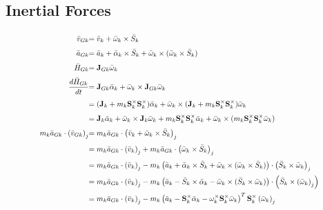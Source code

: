 \documentclass[a4paper,10pt]{article}
\newcommand\scalemath[2]{\scalebox{#1}{\mbox{\ensuremath{\displaystyle #2}}}}
\begin{document}
\subsection{Inertial Forces}
\begin{align}
 \scalemath{0.775}{\bar{v}_{Gk}}&\scalemath{0.775}{=\bar{v}_k+\bar{\omega}_k \times \bar{S}_k} \nonumber \\
 \scalemath{0.775}{\bar{a}_{Gk}}&\scalemath{0.775}{=\bar{a}_k+\bar{\alpha}_k \times \bar{S}_k + \bar{\omega}_k \times (\bar{\omega}_k \times \bar{S}_k)} \nonumber \\
 \scalemath{0.775}{\bar{H}_{Gk}}&\scalemath{0.775}{=\mathbf{J}_{Gk} \bar{\omega}_k} \nonumber \\ 
 \scalemath{0.775}{\frac{d\bar{H}_{Gk}}{dt}}&\scalemath{0.775}{=\mathbf{J}_{Gk} \bar{\alpha}_k + \bar{\omega}_k \times \mathbf{J}_{Gk} \bar{\omega}_k} \nonumber \\
 &\scalemath{0.775}{=(\mathbf{J}_{k}+m_k\mathbf{S}^{\times}_k\mathbf{S}^{\times}_k) \bar{\alpha}_k + \bar{\omega}_k \times (\mathbf{J}_{k}+m_k\mathbf{S}^{\times}_k\mathbf{S}^{\times}_k) \bar{\omega}_k} \nonumber \\
 &\scalemath{0.775}{=\mathbf{J}_{k} \bar{\alpha}_k + \bar{\omega}_k \times \mathbf{J}_{k} \bar{\omega}_k + m_k\mathbf{S}^{\times}_k\mathbf{S}^{\times}_k\bar{\alpha}_k + \bar{\omega}_k \times (m_k\mathbf{S}^{\times}_k\mathbf{S}^{\times}_k \bar{\omega}_k)} \nonumber \\
 \scalemath{0.775}{m_k \bar{a}_{Gk} \cdot \left(\bar{v}_{Gk}\right)_j} &\scalemath{0.775}{=  m_k \bar{a}_{Gk} \cdot \left(\bar{v}_k+\bar{\omega}_k \times \bar{S}_k\right)_j} \nonumber \\
 &\scalemath{0.775}{=  m_k \bar{a}_{Gk} \cdot \left(\bar{v}_k\right)_j + m_k \bar{a}_{Gk} \cdot \left(\bar{\omega}_k \times \bar{S}_k\right)_j} \nonumber \\
 &\scalemath{0.775}{=  m_k \bar{a}_{Gk} \cdot \left(\bar{v}_k\right)_j - m_k \left( \bar{a}_k+\bar{\alpha}_k \times \bar{S}_k + \bar{\omega}_k \times (\bar{\omega}_k \times \bar{S}_k) \right) \cdot \left(\bar{S}_k \times \bar{\omega}_k\right)_j} \nonumber \\
 &\scalemath{0.775}{=  m_k \bar{a}_{Gk} \cdot \left(\bar{v}_k\right)_j - m_k \left( \bar{a}_k-\bar{S}_k \times \bar{\alpha}_k - \bar{\omega}_k \times (\bar{S}_k \times \bar{\omega}_k) \right) \cdot \left(\bar{S}_k \times \left(\bar{\omega}_k\right)_j\right)} \nonumber \\
 &\scalemath{0.775}{=  m_k \bar{a}_{Gk} \cdot \left(\bar{v}_k\right)_j - m_k \left( \bar{a}_k-\mathbf{S}^{\times}_k \bar{\alpha}_k - \mathbf{\omega}^{\times}_k \mathbf{S}^{\times}_k \bar{\omega}_k \right)^T  \mathbf{S}^{\times}_k \left(\bar{\omega}_k\right)_j} \nonumber \\

\end{align}
\end{document}
